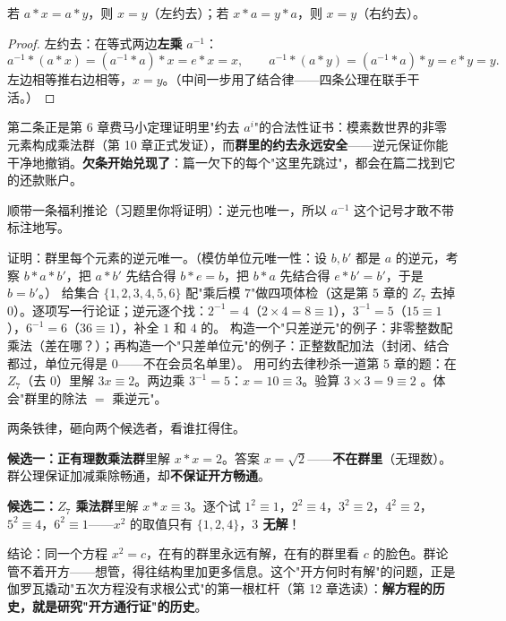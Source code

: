 \begin{dingli}[可约去律]
若 $a*x = a*y$，则 $x = y$（左约去）；若 $x*a = y*a$，则 $x = y$（右约去）。
\end{dingli}
\begin{proof}
左约去：在等式两边\textbf{左乘} $a^{-1}$：
\[
a^{-1}*(a*x) = (a^{-1}*a)*x = e*x = x, \qquad
a^{-1}*(a*y) = (a^{-1}*a)*y = e*y = y .
\]
左边相等推右边相等，$x = y$。（中间一步用了结合律——四条公理在联手干活。）
\end{proof}

第二条正是第 6 章费马小定理证明里"约去 $a^i$"的合法性证书：模素数世界的非零元素构成乘法群（第 10 章正式发证），而\textbf{群里的约去永远安全}——逆元保证你能干净地撤销。\textbf{欠条开始兑现了}：篇一欠下的每个"这里先跳过"，都会在篇二找到它的还款账户。

顺带一条福利推论（习题里你将证明）：逆元也唯一，所以 $a^{-1}$ 这个记号才敢不带标注地写。

\begin{dongshou}
\begin{itemize}
  \yisi 证明：群里每个元素的逆元唯一。（模仿单位元唯一性：设 $b, b'$ 都是 $a$ 的逆元，考察 $b*a*b'$，把 $a*b'$ 先结合得 $b*e = b$，把 $b*a$ 先结合得 $e*b' = b'$，于是 $b = b'$。）
  \yier 给集合 $\{1, 2, 3, 4, 5, 6\}$ 配"乘后模 $7$"做四项体检（这是第 5 章的 $Z_7$ 去掉 $0$）。逐项写一行论证；逆元逐个找：$2^{-1} = 4$（$2\times4 = 8\equiv1$），$3^{-1} = 5$（$15\equiv1$），$6^{-1} = 6$（$36\equiv1$），补全 $1$ 和 $4$ 的。
  \yier 构造一个"只差逆元"的例子：非零整数配乘法（差在哪？）；再构造一个"只差单位元"的例子：正整数配加法（封闭、结合都过，单位元得是 $0$——不在会员名单里）。
  \yisi 用可约去律秒杀一道第 5 章的题：在 $Z_7$（去 $0$）里解 $3x \equiv 2$。两边乘 $3^{-1} = 5$：$x = 10 \equiv 3$。验算 $3\times3 = 9 \equiv 2$ \checkmark。体会"群里的除法 $=$ 乘逆元"。
\end{itemize}
\end{dongshou}

\begin{shaonao}
两条铁律，砸向两个候选者，看谁扛得住。

\textbf{候选一：正有理数乘法群}里解 $x*x = 2$。答案 $x = \sqrt2$——\textbf{不在群里}（无理数）。群公理保证加减乘除畅通，却\textbf{不保证开方畅通}。

\textbf{候选二：$Z_7$ 乘法群}里解 $x*x \equiv 3$。逐个试 $1^2\equiv1$，$2^2\equiv4$，$3^2\equiv2$，$4^2\equiv2$，$5^2\equiv4$，$6^2\equiv1$——$x^2$ 的取值只有 $\{1,2,4\}$，\textbf{$3$ 无解}！

结论：同一个方程 $x^2 = c$，在有的群里永远有解，在有的群里看 $c$ 的脸色。群论管不着开方——想管，得往结构里加更多信息。这个"开方何时有解"的问题，正是伽罗瓦撬动"五次方程没有求根公式"的第一根杠杆（第 12 章选读）：\textbf{解方程的历史，就是研究"开方通行证"的历史}。
\end{shaonao}

